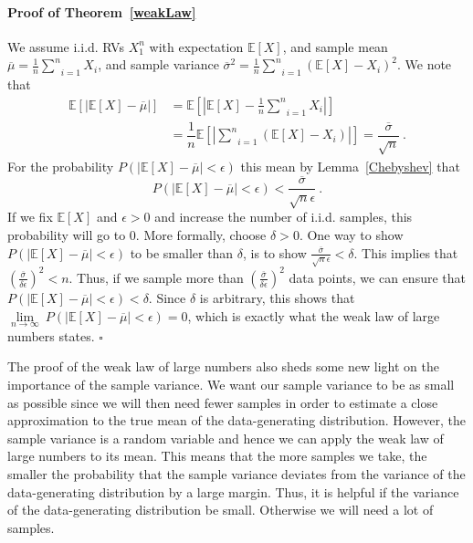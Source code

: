 \paragraph{Proof of Theorem~\ref{weakLaw}} We assume i.i.d. RVs $ X_{1}^{n} $ with expectation $ \mathbb{E}[X] $, and sample mean 
$ \overline{\mu} = \frac{1}{n} \underset{i=1}{\overset{n}{\sum}} X_{i} $, and sample variance 
$ \overline{\sigma}^{2} = \frac{1}{n} \underset{i=1}{\overset{n}{\sum}} \left(\mathbb{E}[X] - X_{i}\right)^{2} $. We note that 
\begin{align}
\mathbb{E}\left[|\mathbb{E}[X] - \overline{\mu}|\right] 
&= \mathbb{E} \left[|\mathbb{E}[X] - \frac{1}{n} \underset{i=1}{\overset{n}{\sum}} X_{i}|\right] \\
&= \dfrac{1}{n} \mathbb{E} \left[|\underset{i=1}{\overset{n}{\sum}}(\mathbb{E}[X] -  X_{i})| \right]
= \dfrac{\overline{\sigma}}{\sqrt{n}} \ .
\end{align}
For the probability $ P(|\mathbb{E}[X] - \overline{\mu}| < \epsilon) $ this mean by Lemma~\ref{Chebyshev} that
\begin{equation}
P(|\mathbb{E}[X] - \overline{\mu}| < \epsilon) < \dfrac{\overline{\sigma}}{\sqrt{n}\epsilon} \ .
\end{equation}
If we fix $ \mathbb{E}[X] $ and $ \epsilon > 0 $ and increase the number of i.i.d. samples, this probability will go to 0.
More formally, choose $ \delta > 0 $. One way to show $ P(|\mathbb{E}[X] - \overline{\mu}| < \epsilon) $ to be smaller than $ \delta $, is to show 
$ \frac{\overline{\sigma}}{\sqrt{n}\epsilon} < \delta $. This implies that $ \left( \frac{\overline{\sigma}}{\delta\epsilon} \right)^{2} < n $. Thus, if we sample
more than $  \left( \frac{\overline{\sigma}}{\delta\epsilon} \right)^{2} $ data points, we can ensure that $ P(|\mathbb{E}[X] - \overline{\mu}| < \epsilon) < \delta $.
Since $ \delta $ is arbitrary, this shows that $ \underset{n \rightarrow \infty}{\lim}~P(|\mathbb{E}[X] - \overline{\mu}| < \epsilon) = 0 $, 
which is exactly what the weak law of large numbers states. $ \square $ \bigskip

The proof of the weak law of large numbers also sheds some new light on the importance of the sample variance. We want our sample variance to be as small as possible
since we will then need fewer samples in order to estimate a close approximation to the true mean of the data-generating distribution. However, the sample variance
is a random variable and hence we can apply the weak law of large numbers to its mean. This means that the more samples we take, the smaller the probability that the
sample variance deviates from the variance of the data-generating distribution by a large margin. Thus, it is helpful if the variance of the 
data-generating distribution be small. Otherwise we will need a lot of samples.

